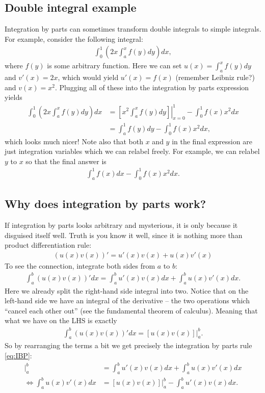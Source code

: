 \documentclass{article}
\begin{document}
\subsection{Double integral example}

Integration by parts can sometimes transform double integrals to simple integrals. For example, consider the following integral:
\begin{align*}
	\int_0^1 \left(2x \int_a^x f(y) dy\right) dx,
\end{align*}
where $f(y)$ is some arbitrary function. Here we can set $u(x) = \int_a^x f(y) dy$ and $v'(x) = 2x$, which would yield $u'(x) = f(x)$ (remember Leibniz rule?) and $v(x) = x^2$. Plugging all of these into the integration by parts expression yields
\begin{align*}
	\int_0^1 \left(2x \int_a^x f(y) dy\right) dx &= \left.\left[ x^2 \int_a^x f(y)dy \right]\right|_{x=0}^1 - \int_0^1 f(x) x^2 dx
	\\
	&= \int_a^1 f(y) dy - \int_0^1 f(x) x^2 dx,
\end{align*}
which looks much nicer! Note also that both $x$ and $y$ in the final expression are just integration variables which we can relabel freely. For example, we can relabel $y$ to $x$ so that the final answer is
\begin{align*}
	\int_a^1 f(x) dx - \int_0^1 f(x) x^2 dx.
\end{align*}


\subsection{Why does integration by parts work?}

If integration by parts looks arbitrary and mysterious, it is only because it disguised itself well. Truth is you know it well, since it is nothing more than product differentiation rule:
\begin{align*}
	\left( u(x)v(x) \right)' = u'(x) v(x) + u(x) v'(x)
\end{align*}
To see the connection, integrate both sides from $a$ to $b$:
\begin{align*}
	\int_a^b \left( u(x)v(x) \right)' dx = \int_a^b u'(x) v(x) dx + \int_a^b u(x) v'(x) dx.
\end{align*}
Here we already split the right-hand side integral into two. Notice that on the left-hand side we have an integral of the derivative -- the two operations which ``cancel each other out'' (see the fundamental theorem of calculus). Meaning that what we have on the LHS is exactly
\begin{align*}
	\int_a^b \left( u(x)v(x) \right)' dx = [u(x)v(x)]|_a^b.
\end{align*}
So by rearranging the terms a bit we get precisely the integration by parts rule \eqref{eq:IBP}:
\begin{align*}
	[u(x)v(x)]|_a^b &= \int_a^b u'(x) v(x) dx + \int_a^b u(x) v'(x) dx
	\\
	\Leftrightarrow \int_a^b u(x) v'(x) dx &= [u(x)v(x)]|_a^b - \int_a^b u'(x) v(x) dx.
\end{align*}
\end{document}
